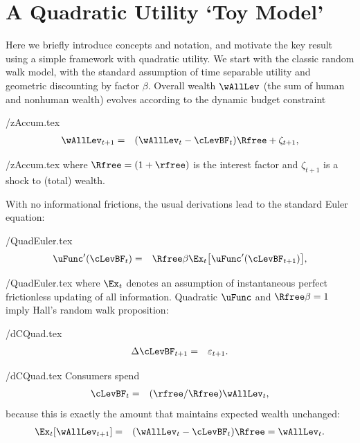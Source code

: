 \documentclass[titlepage]{\econtex}\newcommand{\texname}{cAndCwithStickyE}
\begin{document}
\section{A Quadratic Utility `Toy Model'}\label{sec:Quadratic}

Here we briefly introduce concepts and notation, and motivate the key result using a simple framework with quadratic utility.  We start with the classic \cite{hallRandomWalk} random walk model, with the standard assumption of time separable utility and geometric discounting by factor $\beta$.  Overall wealth $\wAllLev$ (the sum of human and nonhuman wealth) evolves according to the dynamic budget constraint
\begin{verbatimwrite}{\eq/zAccum.tex}
\begin{eqnarray}
  \wAllLev_{t+1} & = & (\wAllLev_{t}-\cLevBF_{t})\Rfree+\zeta_{t+1}, \label{eq:zAccum}
\end{eqnarray}
\end{verbatimwrite}
 \eq/zAccum.tex
where $\Rfree=(1+\rfree)$ is the interest factor and $\zeta_{t+1}$ is a shock to (total) wealth.

With no informational frictions, the usual derivations lead to the standard Euler equation:
\begin{verbatimwrite}{\eq/QuadEuler.tex}
\begin{eqnarray*}
  \uFunc^{\prime}(\cLevBF_{t}) & = & \Rfree\beta \Ex_{t}\big[\uFunc^{\prime}(\cLevBF_{t+1})\big], \label{eq:QuadEuler}
\end{eqnarray*}
\end{verbatimwrite}
 \eq/QuadEuler.tex
where $\Ex_{t}$ denotes an assumption of instantaneous perfect frictionless updating of all information. Quadratic $\uFunc$ and $\Rfree \beta=1$ imply Hall's random walk proposition:
\begin{verbatimwrite}{\eq/dCQuad.tex}
\begin{eqnarray*}
  \Delta \cLevBF_{t+1} & = & \varepsilon_{t+1} \label{eq:dCQuad}.
\end{eqnarray*}
\end{verbatimwrite}
 \eq/dCQuad.tex
Consumers spend
\begin{eqnarray*}
  \cLevBF_{t} & = & (\rfree/\Rfree) \wAllLev_{t}, \label{eq:cquad}
\end{eqnarray*}
because this is exactly the amount that maintains expected wealth unchanged:
\begin{eqnarray*}
  \Ex_{t}[\wAllLev_{t+1}] & = & (\wAllLev_{t}-\cLevBF_{t})\Rfree = \wAllLev_{t}
.
\end{eqnarray*}
\end{document}
